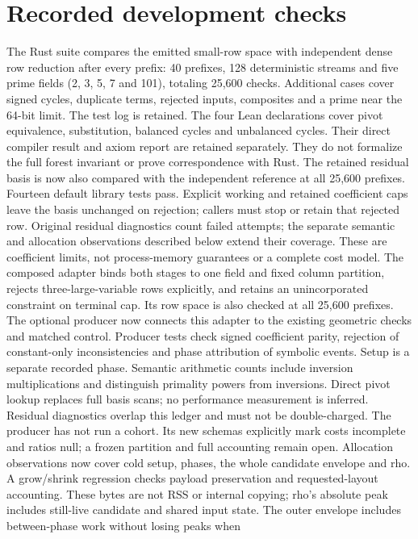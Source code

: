 \documentclass[11pt]{article}
\begin{document}
\section*{Recorded development checks}
The Rust suite compares the emitted small-row space with independent dense
row reduction after every prefix: 40 prefixes, 128 deterministic streams and
five prime fields (2, 3, 5, 7 and 101), totaling 25,600 checks.
Additional cases cover signed cycles, duplicate terms, rejected inputs,
composites and a prime near the 64-bit limit. The test log is retained.
The four Lean declarations cover pivot equivalence, substitution, balanced
cycles and unbalanced cycles. Their direct compiler result and axiom report
are retained separately. They do not formalize the full forest invariant or
prove correspondence with Rust.
The retained residual basis is now also compared with the independent reference
at all 25,600 prefixes. Fourteen default library tests pass. Explicit working and retained
coefficient caps leave the basis unchanged on rejection; callers must stop or
retain that rejected row. Original residual diagnostics count failed attempts; the separate semantic
and allocation observations described below extend their coverage. These are
coefficient limits, not process-memory guarantees or a complete cost model.
The composed adapter binds both stages to one field and fixed column
partition, rejects three-large-variable rows explicitly, and retains an
unincorporated constraint on terminal cap. Its row space is also checked
at all 25,600 prefixes. The optional producer now connects this adapter to
the existing geometric checks and matched control. Producer tests check
signed coefficient parity, rejection of constant-only inconsistencies and
phase attribution of symbolic events. Setup is a separate recorded phase.
Semantic arithmetic counts include inversion multiplications and distinguish
primality powers from inversions. Direct pivot lookup replaces full basis
scans; no performance measurement is inferred. Residual diagnostics overlap
this ledger and must not be double-charged.
The producer has not run a cohort. Its new schemas explicitly mark costs
incomplete and ratios null; a frozen partition and full accounting remain open.
Allocation observations now cover cold setup, phases, the whole candidate
envelope and rho. A grow/shrink regression checks payload preservation and
requested-layout accounting. These bytes are not RSS or internal copying;
rho's absolute peak includes still-live candidate and shared input state.
The outer envelope includes between-phase work without losing peaks when
\end{document}
